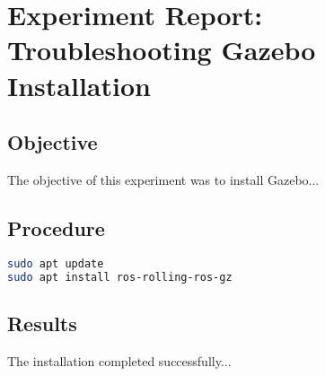 \section{Experiment Report: Troubleshooting Gazebo Installation}

\subsection*{Objective}
The objective of this experiment was to install Gazebo...

\subsection*{Procedure}
\begin{lstlisting}[language=bash]
sudo apt update
sudo apt install ros-rolling-ros-gz
\end{lstlisting}

\subsection*{Results}
The installation completed successfully...
